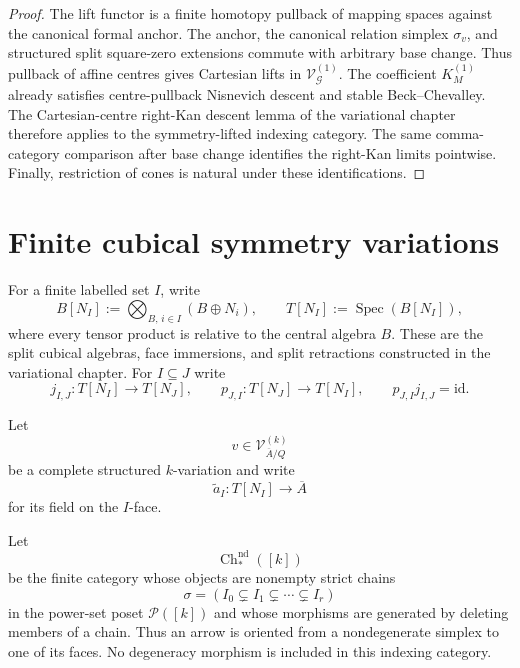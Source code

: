 \begin{proof}
The lift functor is a finite homotopy pullback of mapping spaces against the
canonical formal anchor.  The anchor, the canonical relation simplex $\sigma_v$,
and structured split square-zero extensions commute with arbitrary base change.
Thus pullback of affine centres gives Cartesian lifts in
$\mathcal V_{\mathcal G}^{(1)}$.  The coefficient
$K_M^{(1)}$ already satisfies centre-pullback Nisnevich descent and stable
Beck--Chevalley.  The Cartesian-centre right-Kan descent lemma of the variational
chapter therefore applies to the symmetry-lifted indexing category.  The same
comma-category comparison after base change identifies the right-Kan limits
pointwise.  Finally, restriction of cones is natural under these identifications.
\end{proof}

\section{Finite cubical symmetry variations}
\label{sec:symmetry-noether-finite-cubical-symmetry-variations}

For a finite labelled set $I$, write
\[
B[N_I]
:=
\bigotimes_{B,\,i\in I}(B\oplus N_i),
\qquad
T[N_I]
:=
\operatorname{Spec}(B[N_I]),
\]
where every tensor product is relative to the central algebra $B$.  These are the
split cubical algebras, face immersions, and split retractions constructed in the
variational chapter.  For $I\subseteq J$ write
\[
j_{I,J}:T[N_I]\longrightarrow T[N_J],
\qquad
p_{J,I}:T[N_J]\longrightarrow T[N_I],
\qquad
p_{J,I}j_{I,J}=\mathrm{id}.
\]

Let
\[
v\in\mathcal V_{\overline A/Q}^{(k)}
\]
be a complete structured $k$-variation and write
\[
\widetilde a_I:T[N_I]\longrightarrow\overline A
\]
for its field on the $I$-face.

\begin{definition}
\label{def:symmetry-noether-nondegenerate-face-chain-category}
Let
\[
\operatorname{Ch}^{\mathrm{nd}}_*([k])
\]
be the finite category whose objects are nonempty strict chains
\[
\sigma=(I_0\subsetneq I_1\subsetneq\cdots\subsetneq I_r)
\]
in the power-set poset $\mathcal P([k])$ and whose morphisms are generated by
deleting members of a chain.  Thus an arrow is oriented from a nondegenerate
simplex to one of its faces.  No degeneracy morphism is included in this indexing
category.
\end{definition}

